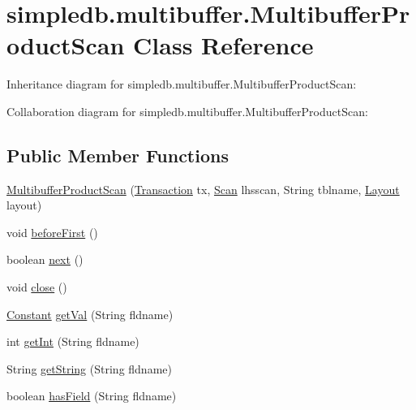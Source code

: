 \hypertarget{classsimpledb_1_1multibuffer_1_1MultibufferProductScan}{}\section{simpledb.\+multibuffer.\+Multibuffer\+Product\+Scan Class Reference}
\label{classsimpledb_1_1multibuffer_1_1MultibufferProductScan}


Inheritance diagram for simpledb.\+multibuffer.\+Multibuffer\+Product\+Scan\+:


Collaboration diagram for simpledb.\+multibuffer.\+Multibuffer\+Product\+Scan\+:
\subsection*{Public Member Functions}
\begin{DoxyCompactItemize}
\item 
\hyperlink{classsimpledb_1_1multibuffer_1_1MultibufferProductScan_a5dc4e4e042eeec2cbed845ecd4ae6d50}{Multibuffer\+Product\+Scan} (\hyperlink{classsimpledb_1_1tx_1_1Transaction}{Transaction} tx, \hyperlink{interfacesimpledb_1_1query_1_1Scan}{Scan} lhsscan, String tblname, \hyperlink{classsimpledb_1_1record_1_1Layout}{Layout} layout)
\item 
void \hyperlink{classsimpledb_1_1multibuffer_1_1MultibufferProductScan_ab8cc812f19837c2f6b559d2f6734d858}{before\+First} ()
\item 
boolean \hyperlink{classsimpledb_1_1multibuffer_1_1MultibufferProductScan_aec94240353c72bb7eedb60dbe7d3d5e6}{next} ()
\item 
void \hyperlink{classsimpledb_1_1multibuffer_1_1MultibufferProductScan_a20a1d9952bcac4f243d591b56cefaad2}{close} ()
\item 
\hyperlink{classsimpledb_1_1query_1_1Constant}{Constant} \hyperlink{classsimpledb_1_1multibuffer_1_1MultibufferProductScan_acb1cdfd6dfe1b848e423bfb4b513b48f}{get\+Val} (String fldname)
\item 
int \hyperlink{classsimpledb_1_1multibuffer_1_1MultibufferProductScan_ab41a5fafcf3d1af5b9657e83b1d734c2}{get\+Int} (String fldname)
\item 
String \hyperlink{classsimpledb_1_1multibuffer_1_1MultibufferProductScan_ad79341706c7a797ec6d56dc7c04b9276}{get\+String} (String fldname)
\item 
boolean \hyperlink{classsimpledb_1_1multibuffer_1_1MultibufferProductScan_afc843ca9e632e75d171245fe59e2bd14}{has\+Field} (String fldname)
\end{DoxyCompactItemize}


